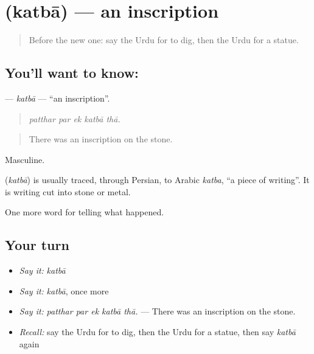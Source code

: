 \section[\texorpdfstring{\ur{کتبہ} (katbā)}{کتبہ (katbā)}]{ (katbā) — an inscription}

\label{lesson:UR-C314-katba}



\begin{quote}
Before the new one: say the Urdu for to dig, then the Urdu for a statue.
\end{quote}

\subsection*{You'll want to know: }
\textbf{} — \emph{katbā} — \textquotedblleft{}an inscription\textquotedblright{}.

\begin{quote}
    
\end{quote}

\begin{quote}
\emph{patthar par ek katbā thā.}
\end{quote}

\begin{quote}
There was an inscription on the stone.
\end{quote}

Masculine.

\begin{cousinweb}
\textbf{} (\emph{katbā}) is usually traced, through Persian, to Arabic \emph{katba}, \textquotedblleft{}a piece of writing\textquotedblright{}. It is writing cut into stone or metal.
\end{cousinweb}

\begin{grammarlens}[title={What you've built}]
One more word for telling what happened.
\end{grammarlens}

\subsection*{Your turn}
\begin{itemize}
\raggedright
  \item \emph{Say it:} \emph{katbā}
  \item \emph{Say it:} \emph{katbā}, once more
  \item \emph{Say it:} \emph{patthar par ek katbā thā.} — There was an inscription on the stone.
  \item \emph{Recall:} say the Urdu for to dig, then the Urdu for a statue, then say \emph{katbā} again
\end{itemize}

